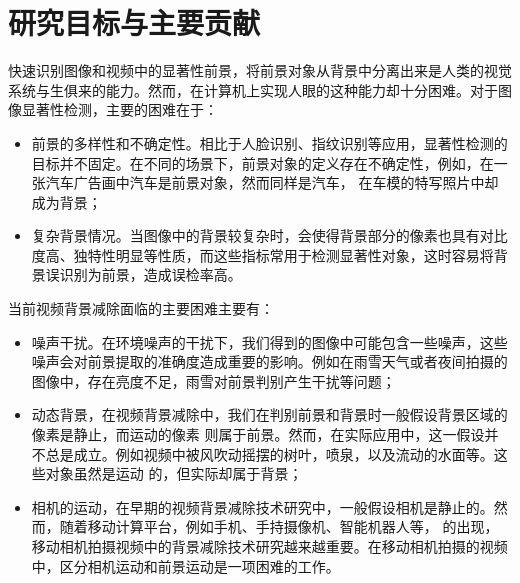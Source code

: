 \section{研究目标与主要贡献}
\label{sec:contents}
快速识别图像和视频中的显著性前景，将前景对象从背景中分离出来是人类的视觉系统与生俱来的能力。然而，在计算机上实现人眼的这种能力却十分困难。对于图像显著性检测，主要的困难在于：
 \begin{itemize}
     \item 前景的多样性和不确定性。相比于人脸识别、指纹识别等应用，显著性检测的目标并不固定。在不同的场景下，前景对象的定义存在不确定性，例如，在一张汽车广告画中汽车是前景对象，然而同样是汽车， 在车模的特写照片中却成为背景；
	\item 复杂背景情况。当图像中的背景较复杂时，会使得背景部分的像素也具有对比度高、独特性明显等性质，而这些指标常用于检测显著性对象，这时容易将背景误识别为前景，造成误检率高。
\end{itemize}
当前视频背景减除面临的主要困难主要有：
\begin{itemize}
	\item 噪声干扰。在环境噪声的干扰下，我们得到的图像中可能包含一些噪声，这些噪声会对前景提取的准确度造成重要的影响。例如在雨雪天气或者夜间拍摄的图像中，存在亮度不足，雨雪对前景判别产生干扰等问题；
    \item 动态背景，在视频背景减除中，我们在判别前景和背景时一般假设背景区域的像素是静止，而运动的像素
    则属于前景。然而，在实际应用中，这一假设并不总是成立。例如视频中被风吹动摇摆的树叶，喷泉，以及流动的水面等。这些对象虽然是运动
    的，但实际却属于背景；
    \item 相机的运动，在早期的视频背景减除技术研究中，一般假设相机是静止的。然而，随着移动计算平台，例如手机、手持摄像机、智能机器人等，
    的出现，移动相机拍摄视频中的背景减除技术研究越来越重要。在移动相机拍摄的视频中，区分相机运动和前景运动是一项困难的工作。
  \end{itemize}


